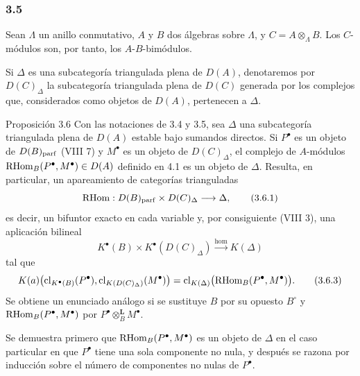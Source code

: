 \subsubsection*{3.5}

Sean $\Lambda$ un anillo conmutativo, $A$ y $B$ dos álgebras sobre $\Lambda$, y $C=A\otimes_{\Lambda}B$. Los $C$-módulos son, por tanto, los $A$-$B$-bimódulos.

Si $\Delta$ es una subcategoría triangulada plena de $D(A)$, denotaremos por $D(C)_{\Delta}$ la subcategoría triangulada plena de $D(C)$ generada por los complejos que, considerados como objetos de $D(A)$, pertenecen a $\Delta$.

\begin{statement}{Proposición 3.6}
Con las notaciones de 3.4 y 3.5, sea $\Delta$ una subcategoría triangulada plena de $D(A)$ estable bajo sumandos directos. Si $P^\bullet$ es un objeto de $D(B)_{\mathrm{parf}}$ (VIII 7) y $M^\bullet$ es un objeto de $D(C)_{\Delta}$, el complejo de $A$-módulos $\mathrm{RHom}_B(P^\bullet,M^\bullet)\in D(A)$ definido en 4.1 es un objeto de $\Delta$. Resulta, en particular, un apareamiento de categorías trianguladas
\[
\mathrm{RHom}:D(B)_{\mathrm{parf}}\times D(C)_{\Delta}\longrightarrow \Delta,
\tag{3.6.1}
\]
es decir, un bifuntor exacto en cada variable y, por consiguiente (VIII 3), una aplicación bilineal
\[
K^{\bullet}(B)\times K^{\bullet}(D(C)_{\Delta})\xrightarrow{\operatorname{hom}} K(\Delta)
\tag{3.6.2}
\]
tal que
\[
K(a)\bigl(\operatorname{cl}_{K^{\bullet}(B)}(P^\bullet),\operatorname{cl}_{K(D(C)_{\Delta})}(M^\bullet)\bigr)
=\operatorname{cl}_{K(\Delta)}\bigl(\mathrm{RHom}_B(P^\bullet,M^\bullet)\bigr).
\tag{3.6.3}
\]
Se obtiene un enunciado análogo si se sustituye $B$ por su opuesto $B^\circ$ y $\mathrm{RHom}_B(P^\bullet,M^\bullet)$ por $P^\bullet\otimes_B^{\mathbf L}M^\bullet$.
\end{statement}

\begin{prooftext}[Demostración]
Se demuestra primero que $\mathrm{RHom}_B(P^\bullet,M^\bullet)$ es un objeto de $\Delta$ en el caso particular en que $P^\bullet$ tiene una sola componente no nula, y después se razona por inducción sobre el número de componentes no nulas de $P^\bullet$.
\end{prooftext}
